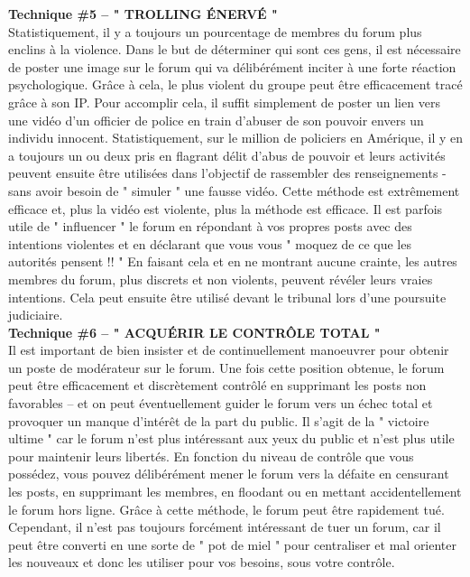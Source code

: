 \documentclass[11pt,twoside,a4paper]{article}
\begin{document}
\textbf{\large Technique \#5 -- " TROLLING {\'E}NERV{\'E} "}~\\

Statistiquement, il y a toujours un pourcentage de membres du forum plus enclins {\`a} la violence. Dans le but de d{\'e}terminer qui sont ces gens, il est n{\'e}cessaire de poster une image sur le forum qui va d{\'e}lib{\'e}r{\'e}ment inciter {\`a} une forte r{\'e}action psychologique. Gr{\^a}ce {\`a} cela, le plus violent du groupe peut {\^e}tre efficacement trac{\'e} gr{\^a}ce {\`a} son IP. Pour accomplir cela, il suffit simplement de poster un lien vers une vid{\'e}o d'un officier de police en train d'abuser de son pouvoir envers un individu innocent. Statistiquement, sur le million de policiers en Am{\'e}rique, il y en a toujours un ou deux pris en flagrant d{\'e}lit d'abus de pouvoir et leurs activit{\'e}s peuvent ensuite {\^e}tre utilis{\'e}es dans l'objectif de rassembler des renseignements - sans avoir besoin de " simuler " une fausse vid{\'e}o. Cette m{\'e}thode est extr{\^e}mement efficace et, plus la vid{\'e}o est violente, plus la m{\'e}thode est efficace. Il est parfois utile de " influencer " le forum en r{\'e}pondant {\`a} vos propres posts avec des intentions violentes et en d{\'e}clarant que vous vous " moquez de ce que les autorit{\'e}s pensent !! " En faisant cela et en ne montrant aucune crainte, les autres membres du forum, plus discrets et non violents, peuvent r{\'e}v{\'e}ler leurs vraies intentions. Cela peut ensuite {\^e}tre utilis{\'e} devant le tribunal lors d'une poursuite judiciaire.~\\

\textbf{\large Technique \#6 -- " ACQU{\'E}RIR LE CONTR{\^O}LE TOTAL "}~\\

Il est important de bien insister et de continuellement manoeuvrer pour obtenir un poste de mod{\'e}rateur sur le forum. Une fois cette position obtenue, le forum peut {\^e}tre efficacement et discr{\`e}tement contr{\^o}l{\'e} en supprimant les posts non favorables -- et on peut {\'e}ventuellement guider le forum vers un {\'e}chec total et provoquer un manque d'int{\'e}r{\^e}t de la part du public. Il s'agit de la " victoire ultime " car le forum n'est plus int{\'e}ressant aux yeux du public et n'est plus utile pour maintenir leurs libert{\'e}s. En fonction du niveau de contr{\^o}le que vous poss{\'e}dez, vous pouvez d{\'e}lib{\'e}r{\'e}ment mener le forum vers la d{\'e}faite en censurant les posts, en supprimant les membres, en floodant ou en mettant accidentellement le forum hors ligne. Gr{\^a}ce {\`a} cette m{\'e}thode, le forum peut {\^e}tre rapidement tu{\'e}. Cependant, il n'est pas toujours forc{\'e}ment int{\'e}ressant de tuer un forum, car il peut {\^e}tre converti en une sorte de " pot de miel " pour centraliser et mal orienter les nouveaux et donc les utiliser pour vos besoins, sous votre contr{\^o}le.~\\
\end{document}
